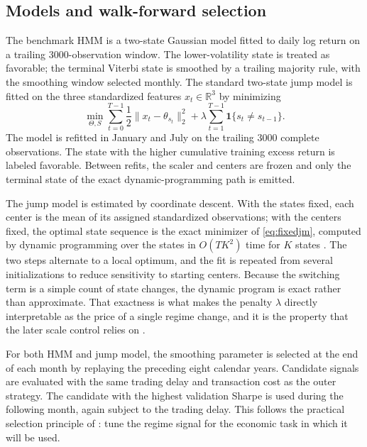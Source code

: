 \documentclass[11pt]{article}
\newcommand{\ind}{\mathbf{1}}
\begin{document}
\subsection{Models and walk-forward selection}

The benchmark HMM is a two-state Gaussian model fitted to daily log return on a
trailing 3000-observation window. The lower-volatility state is treated as
favorable; the terminal Viterbi state is smoothed by a trailing majority rule,
with the smoothing window selected monthly. The standard two-state jump model is
fitted on the three standardized features $x_t\in\mathbb{R}^3$ by minimizing
\begin{equation}
\min_{\Theta,S}\sum_{t=0}^{T-1}\frac{1}{2}\lVert x_t-\theta_{s_t}\rVert_2^2
+\lambda\sum_{t=1}^{T-1}\ind\{s_t\neq s_{t-1}\}.
\label{eq:fixedjm}
\end{equation}
The model is refitted in January and July on the trailing 3000 complete
observations. The state with the higher cumulative training excess return is
labeled favorable. Between refits, the scaler and centers are frozen and only the
terminal state of the exact dynamic-programming path is emitted.

The jump model is estimated by coordinate descent. With the states fixed, each
center is the mean of its assigned standardized observations; with the centers
fixed, the optimal state sequence is the exact minimizer of \cref{eq:fixedjm},
computed by dynamic programming over the states in $O(TK^2)$ time for $K$ states
\citep{bemporad2018}. The two steps alternate to a local optimum, and the fit is
repeated from several initializations to reduce sensitivity to starting centers.
Because the switching term is a simple count of state changes, the dynamic
program is exact rather than approximate. That exactness is what makes the
penalty $\lambda$ directly interpretable as the price of a single regime change,
and it is the property that the later scale control relies on
\citep{nystrup2020}.

For both HMM and jump model, the smoothing parameter is selected at the end of
each month by replaying the preceding eight calendar years. Candidate signals are
evaluated with the same trading delay and transaction cost as the outer strategy.
The candidate with the highest validation Sharpe is used during the following
month, again subject to the trading delay. This follows the practical selection
principle of \citet{shu2024}: tune the regime signal for the economic task in
which it will be used.
\end{document}
